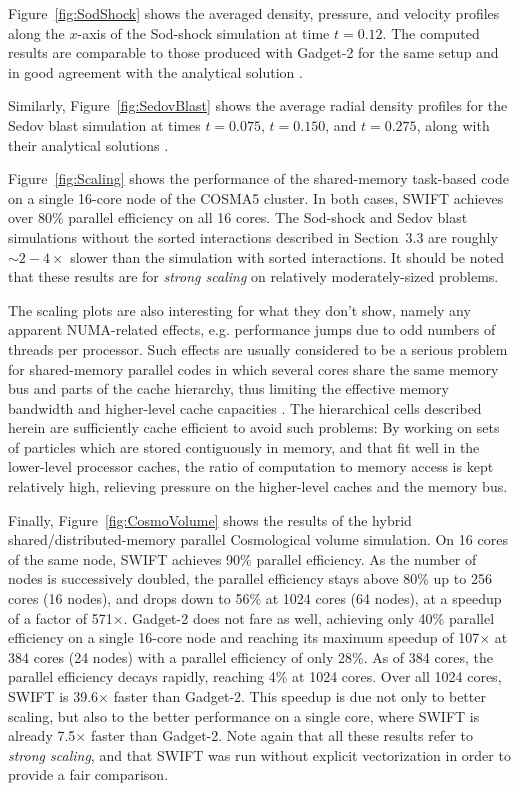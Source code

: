 \documentclass[final]{siamltex}
\newcommand{\fig}[1]
    {Figure~\ref{fig:#1}}
\begin{document}
\fig{SodShock} shows the averaged density, pressure, and velocity profiles
along the $x$-axis of the Sod-shock simulation at time $t=0.12$.
The computed results are comparable to those produced with Gadget-2 for
the same setup and in good agreement with the analytical solution
\cite{ref:Sod1978}.

Similarly, \fig{SedovBlast} shows the average radial density profiles
for the Sedov blast simulation at times $t=0.075$, $t=0.150$, and $t=0.275$,
along with their analytical solutions \cite{ref:Sedov1959}.

\fig{Scaling} shows the performance of the shared-memory task-based 
code on a single 16-core node of the COSMA5 cluster.
In both cases, SWIFT achieves over 80\% parallel efficiency on all
16 cores.
The Sod-shock and Sedov blast simulations without the sorted
interactions described
in Section~3.3 are roughly $\sim 2-4\times$ slower than the simulation
with sorted interactions.
It should be noted that these results are for {\em strong scaling}
on relatively moderately-sized problems.

The scaling plots are also interesting for what they don't show, namely
any apparent NUMA-related effects, e.g. performance jumps due to
odd numbers of threads per processor.
Such effects are usually
considered to be a serious problem for shared-memory parallel codes in
which several cores share the same memory bus and parts of
the cache hierarchy, thus limiting the effective memory bandwidth
and higher-level cache capacities \cite{ref:Thacker2006}.
The hierarchical cells described herein are sufficiently
cache efficient to avoid such problems: By working on sets
of particles which are stored contiguously in memory,
and that fit well in the lower-level processor caches, the ratio
of computation to memory access is kept relatively high, relieving
pressure on the higher-level caches and the memory bus.

Finally, \fig{CosmoVolume} shows the results of the hybrid
shared/distributed-memory parallel Cosmological volume simulation.
On 16 cores of the same node, SWIFT achieves 90\% parallel efficiency.
As the number of nodes is successively doubled, the parallel
efficiency stays above 80\% up to 256 cores (16 nodes), and
drops down to 56\% at 1024 cores (64 nodes), at a speedup
of a factor of 571$\times$.
Gadget-2 does not fare as well, achieving only 40\% parallel efficiency
on a single 16-core node and reaching its maximum speedup of 107$\times$ at
384 cores (24 nodes) with a parallel efficiency of only 28\%.
As of 384 cores, the parallel efficiency decays rapidly, reaching
4\% at 1024 cores.
Over all 1024 cores, SWIFT is 39.6$\times$ faster than Gadget-2.
This speedup is due not only to better scaling, but also to
the better performance on a single core, where SWIFT is already
7.5$\times$ faster than Gadget-2.
Note again that all these results refer to {\em strong scaling},
and that SWIFT was run without explicit vectorization in order
to provide a fair comparison.
\end{document}
